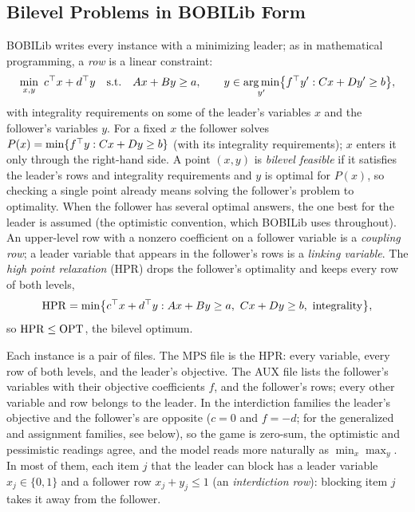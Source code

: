 \subsection{Bilevel Problems in BOBILib Form}\label{sec:prob-form}

BOBILib writes every instance with a minimizing leader; as in mathematical programming, a
\emph{row} is a linear constraint:
\begin{equation}\label{eq:bilevel}
\min_{x,y}\ c^{\top} x+d^{\top} y\quad\text{s.t.}\quad Ax+By\ge a,\qquad
y\in\operatorname*{arg\,min}_{y'}\bigl\{f^{\top} y' : Cx+Dy'\ge b\bigr\},
\end{equation}
with integrality requirements on some of the leader's variables $x$ and the follower's variables
$y$. For a fixed $x$ the follower solves $P(x)=\min\{f^{\top} y: Cx+Dy\ge b\}$ (with its integrality
requirements); $x$ enters it only through the right-hand side. A point $(x,y)$ is \emph{bilevel
feasible} if it satisfies the leader's rows and integrality requirements and $y$ is optimal for
$P(x)$, so checking a single point already means solving the follower's problem to optimality.
When the follower has several optimal answers, the one best for the leader is assumed (the
optimistic convention, which BOBILib uses throughout). An upper-level row with a nonzero
coefficient on a follower variable is a \emph{coupling row}; a leader variable that appears in
the follower's rows is a \emph{linking variable}. The \emph{high point relaxation} (HPR) drops the
follower's optimality and keeps every row of both levels,
\[
\HPR=\min\bigl\{c\T x+d\T y : Ax+By\ge a,\ Cx+Dy\ge b,\ \text{integrality}\bigr\},
\]
so $\mathrm{HPR}\le\mathrm{OPT}$, the bilevel optimum.

Each instance is a pair of files.\cite{thurauf2026bobilib} The MPS file is the HPR: every
variable, every row of both levels, and the leader's objective. The AUX file lists the
follower's variables with their objective coefficients $f$, and the follower's rows; every
other variable and row belongs to the leader. In the interdiction families the leader's
objective and the follower's are opposite ($c=0$ and $f=-d$; for the generalized and
assignment families, see below), so the game is zero-sum, the optimistic and pessimistic
readings agree, and the model reads more naturally as $\min_x\max_y$. In most of them, each
item $j$ that the leader can block has a leader variable $x_j\in\{0,1\}$ and a follower row $x_j+y_j\le 1$
(an \emph{interdiction row}): blocking item $j$ takes it away from the follower.

